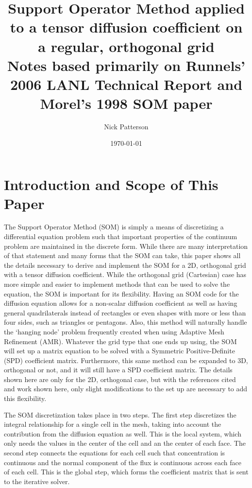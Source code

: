 \documentclass[11pt,letterpaper,oneside,notitlepage]{article}	%
\newcommand{\pindent}[1]{\hspace{6mm}}  		%
\numberwithin{equation}{section}				%
\begin{document}

\title{Support Operator Method applied to a tensor diffusion coefficient on a regular, orthogonal grid\\ {\small Notes based primarily on Runnels' 2006 LANL Technical Report and Morel's 1998 SOM paper}}
\author{Nick Patterson}
\date{\today}								%
\maketitle									%

\tableofcontents
\newpage

\section{Introduction and Scope of This Paper}%
\pindent{}The Support Operator Method (SOM) is simply a means of discretizing a differential equation problem such that important properties of the continuum problem are maintained in the discrete form. While there are many interpretation of that statement and many forms that the SOM can take, this paper shows all the details necessary to derive and implement the SOM for a 2D, orthogonal grid with a tensor diffusion coefficient. While the orthogonal grid (Cartesian) case has more simple and easier to implement methods that can be used to solve the equation, the SOM is important for its flexibility. Having an SOM code for the diffusion equation allows for a non-scalar diffusion coefficient as well as having general quadrilaterals instead of rectangles or even shapes with more or less than four sides, such as triangles or pentagons. Also, this method will naturally handle the `hanging node' problem frequently created when using Adaptive Mesh Refinement (AMR). Whatever the grid type that one ends up using, the SOM will set up a matrix equation to be solved with a Symmetric Positive-Definite (SPD) coefficient matrix. Furthermore, this same method can be expanded to 3D, orthogonal or not, and it will still have a SPD coefficient matrix. The details shown here are only for the 2D, orthogonal case, but with the references cited and work shown here, only slight modifications to the set up are necessary to add this flexibility. 

The SOM discretization takes place in two steps\cite{Lipnikov2004}. The first step discretizes the integral relationship for a single cell in the mesh, taking into account the contribution from the diffusion equation as well. This is the local system, which only needs the values in the center of the cell and an the center of each face. The second step connects the equations for each cell such that concentration is continuous and the normal component of the flux is continuous across each face of each cell. This is the global step, which forms the coefficient matrix that is sent to the iterative solver.
\end{document}
